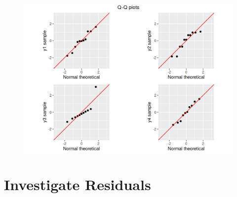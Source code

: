 \documentclass[12pt]{article}
\begin{document}
\begin{figure}[htbp]
\includegraphics[width=.7\textwidth]{QQplot.png}
\centering
\end{figure}


	

	\section{Investigate Residuals}
	
		
	
	
\end{document}
